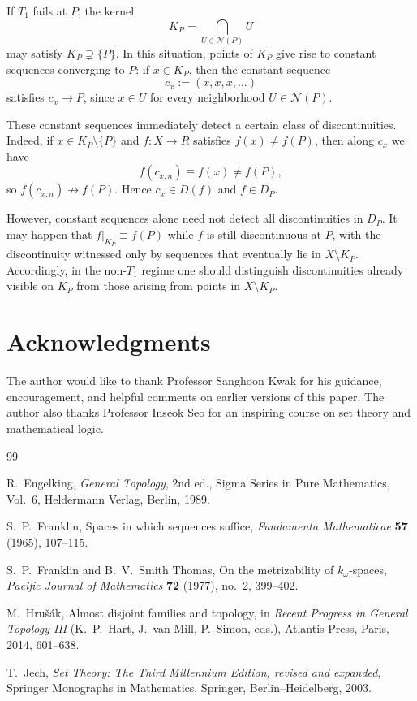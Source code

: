 \documentclass[11pt]{amsart}
\theoremstyle{plain}
\theoremstyle{definition}
\theoremstyle{remark}
\newcommand{\Dp}{\mathcal{D}_P}
\newcommand{\R}{\mathbb{R}}
\def\Dp{D_P}%
\def\R{R}%
\begin{document}
If $T_1$ fails at $P$, the kernel
\[
K_P=\bigcap_{U\in\mathcal N(P)}U
\]
may satisfy $K_P\supsetneq\{P\}$.
In this situation, points of $K_P$ give rise to constant sequences converging to $P$:
if $x\in K_P$, then the constant sequence
\[
c_x:=(x,x,x,\dots)
\]
satisfies $c_x\to P$, since $x\in U$ for every neighborhood $U\in\mathcal N(P)$.

These constant sequences immediately detect a certain class of discontinuities.
Indeed, if $x\in K_P\setminus\{P\}$ and $f:X\to\R$ satisfies $f(x)\neq f(P)$, then along $c_x$ we have
\[
f(c_{x,n})\equiv f(x)\neq f(P),
\]
so $f(c_{x,n})\not\to f(P)$.
Hence $c_x\in D(f)$ and $f\in\Dp$.

However, constant sequences alone need not detect all discontinuities in $\Dp$.
It may happen that $f|_{K_P}\equiv f(P)$ while $f$ is still discontinuous at $P$, with the discontinuity witnessed only by sequences that eventually lie in $X\setminus K_P$.
Accordingly, in the non-$T_1$ regime one should distinguish discontinuities already visible on $K_P$
from those arising from points in $X\setminus K_P$.

\section*{Acknowledgments}

The author would like to thank Professor Sanghoon Kwak for his guidance,
encouragement, and helpful comments on earlier versions of this paper.
The author also thanks Professor Inseok Seo for an inspiring course on set theory
and mathematical logic.
\begin{thebibliography}{99}

R.~Engelking,
\emph{General Topology},
2nd ed., Sigma Series in Pure Mathematics, Vol.~6,
Heldermann Verlag, Berlin, 1989.

S.~P.~Franklin,
Spaces in which sequences suffice,
\emph{Fundamenta Mathematicae} \textbf{57} (1965), 107--115.

S.~P.~Franklin and B.~V.~Smith Thomas,
On the metrizability of \(k_{\omega}\)-spaces,
\emph{Pacific Journal of Mathematics} \textbf{72} (1977), no.~2, 399--402.

M.~Hru\v{s}\'{a}k,
Almost disjoint families and topology,
in \emph{Recent Progress in General Topology III}
(K.~P.~Hart, J.~van Mill, P.~Simon, eds.),
Atlantis Press, Paris, 2014, 601--638.

T.~Jech,
\emph{Set Theory: The Third Millennium Edition, revised and expanded},
Springer Monographs in Mathematics,
Springer, Berlin--Heidelberg, 2003.

\end{thebibliography}
\end{document}
